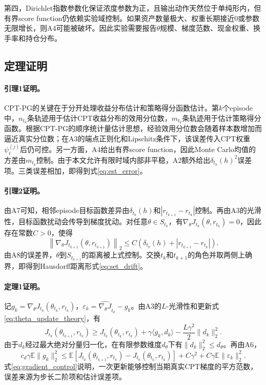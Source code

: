 \documentclass{sufethesismas}
\begin{document}
第四，Dirichlet指数参数化保证浓度参数为正，且输出动作天然位于单纯形内，但有界score function仍依赖实验域控制。如果资产数量极大、权重长期接近0或参数无限增长，则A4可能被破坏。因此实验需要报告$\theta$规模、梯度范数、现金权重、换手率和持仓分布。

\subsection{定理证明}

\paragraph{引理1证明。}
CPT-PG的关键在于分开处理收益分布估计和策略得分函数估计。第$k$个episode中，$n_{t_k}$条轨迹用于估计CPT收益分布的效用分位数，$m_{t_k}$条轨迹用于估计策略得分函数。根据CPT-PG的顺序统计量估计思想，经验效用分位数会随着样本数增加而逼近真实分位数；在A3的端点正则化和Lipschitz条件下，该误差传入CPT权重$\psi_t^{(j)}$后仍可控。另一方面，A4给出有界score function，因此Monte Carlo均值的方差由$m_{t_k}$控制。由于本文允许有限时域内部非平稳，A2额外给出$\delta_{t_k}(h)^2$误差项。三类误差相加，即得到式\eqref{eq:est_error}。

\paragraph{引理2证明。}
由A7可知，相邻episode目标函数差异由$\delta_{t_k}(h)$和$|r_{t_{k+1}}-r_{t_k}|$控制。再由A3的光滑性，目标函数扰动会传导到梯度扰动。对任意$\theta\in S_{t_k}$，有$\nabla_\theta J_{t_k}(\theta,r_{t_k})=0$，因此存在常数$C>0$，使得
\begin{equation*}
\left\|
\nabla_\theta J_{t_{k+1}}(\theta,r_{t_{k+1}})
\right\|_2
\le
C
\left(
\delta_{t_k}(h)+|r_{t_{k+1}}-r_{t_k}|
\right).
\end{equation*}
由A8的误差界，$\theta$到$S_{t_{k+1}}$的距离被上式控制。交换$t_k$和$t_{k+1}$的角色并取两侧上确界，即得到Hausdorff距离形式\eqref{eq:set_drift}。

\paragraph{定理1证明。}
记$g_k=\nabla_\theta J_{t_k}(\theta_{t_k},r_{t_k})$，$\varepsilon_k=\widehat{\nabla_\theta J}_{t_k}-g_k$。由A3的$L$-光滑性和更新式\eqref{eq:theta_update_theory}，有
\begin{equation}
\label{eq:descent_step}
J_{t_k}(\theta_{t_{k+1}},r_{t_k})
\ge
J_{t_k}(\theta_{t_k},r_{t_k})
+
\gamma\langle g_k,d_k\rangle
-
\frac{L\gamma^2}{2}\|d_k\|_2^2.
\end{equation}
由于$d_k$经过最大绝对分量归一化，在有限参数维度$d_\theta$下有$\|d_k\|_2^2\le d_\theta$。再由A6，
\begin{equation}
\label{eq:gradient_control}
c_d\gamma
\mathbb{E}\|g_k\|_2^2
\le
\mathbb{E}
\left[
J_{t_k}(\theta_{t_{k+1}},r_{t_k})
-
J_{t_k}(\theta_{t_k},r_{t_k})
\right]
+
C\gamma^2
+
C\gamma
\mathbb{E}\|\varepsilon_k\|_2^2.
\end{equation}
式\eqref{eq:gradient_control}说明，一次更新能够控制当期真实CPT梯度的平方范数，误差来源为步长二阶项和估计误差项。
\end{document}
